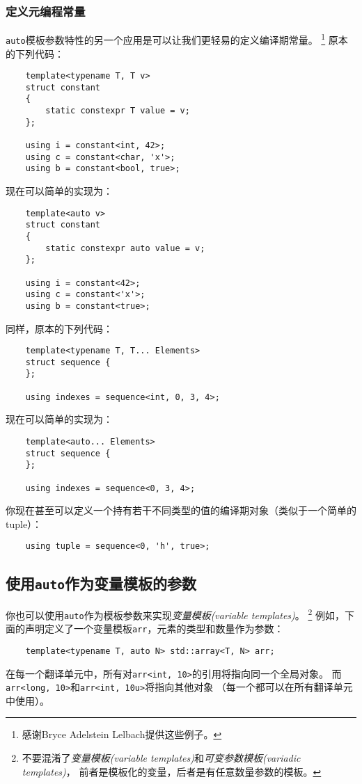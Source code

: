\subsubsection{定义元编程常量}
\texttt{auto}模板参数特性的另一个应用是可以让我们更轻易的定义编译期常量。
\footnote{感谢Bryce Adelstein Lelbach提供这些例子。}
原本的下列代码：
\begin{lstlisting}
    template<typename T, T v>
    struct constant
    {
        static constexpr T value = v;
    };

    using i = constant<int, 42>;
    using c = constant<char, 'x'>;
    using b = constant<bool, true>;
\end{lstlisting}
现在可以简单的实现为：
\begin{lstlisting}
    template<auto v>
    struct constant
    {
        static constexpr auto value = v;
    };

    using i = constant<42>;
    using c = constant<'x'>;
    using b = constant<true>;
\end{lstlisting}
同样，原本的下列代码：
\begin{lstlisting}
    template<typename T, T... Elements>
    struct sequence {
    };

    using indexes = sequence<int, 0, 3, 4>;
\end{lstlisting}
现在可以简单的实现为：
\begin{lstlisting}
    template<auto... Elements>
    struct sequence {
    };

    using indexes = sequence<0, 3, 4>;
\end{lstlisting}
你现在甚至可以定义一个持有若干不同类型的值的编译期对象（类似于一个简单的tuple）：
\begin{lstlisting}
    using tuple = sequence<0, 'h', true>;
\end{lstlisting}

\subsection{使用\texttt{auto}作为变量模板的参数}
你也可以使用\texttt{auto}作为模板参数来实现\emph{变量模板(variable templates)}。
\footnote{不要混淆了\emph{变量模板(variable templates)}和\emph{可变参数模板(variadic templates)}，
前者是模板化的变量，后者是有任意数量参数的模板。}
例如，下面的声明定义了一个变量模板\texttt{arr}，元素的类型和数量作为参数：
\begin{lstlisting}
    template<typename T, auto N> std::array<T, N> arr;
\end{lstlisting}
在每一个翻译单元中，所有对\texttt{arr<int, 10>}的引用将指向同一个全局对象。
而\texttt{arr<long, 10>}和\texttt{arr<int, 10u>}将指向其他对象
（每一个都可以在所有翻译单元中使用）。

